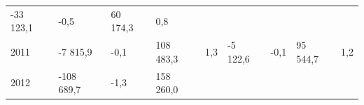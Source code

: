 \begin{longtable}[]{@{}lllllllll@{}}
\begin{minipage}[t]{0.12\columnwidth}
-33 123,1\strut
\end{minipage} & \begin{minipage}[t]{0.06\columnwidth}\raggedright
-0,5\strut
\end{minipage} & \begin{minipage}[t]{0.08\columnwidth}\raggedright
60 174,3\strut
\end{minipage} & \begin{minipage}[t]{0.06\columnwidth}\raggedright
0,8\strut
\end{minipage}\tabularnewline
\begin{minipage}[t]{0.05\columnwidth}\raggedright
2011\strut
\end{minipage} & \begin{minipage}[t]{0.10\columnwidth}\raggedright
-7 815,9\strut
\end{minipage} & \begin{minipage}[t]{0.06\columnwidth}\raggedright
-0,1\strut
\end{minipage} & \begin{minipage}[t]{0.17\columnwidth}\raggedright
108 483,3\strut
\end{minipage} & \begin{minipage}[t]{0.06\columnwidth}\raggedright
1,3\strut
\end{minipage} & \begin{minipage}[t]{0.12\columnwidth}\raggedright
-5 122,6\strut
\end{minipage} & \begin{minipage}[t]{0.06\columnwidth}\raggedright
-0,1\strut
\end{minipage} & \begin{minipage}[t]{0.08\columnwidth}\raggedright
95 544,7\strut
\end{minipage} & \begin{minipage}[t]{0.06\columnwidth}\raggedright
1,2\strut
\end{minipage}\tabularnewline
\begin{minipage}[t]{0.05\columnwidth}\raggedright
2012\strut
\end{minipage} & \begin{minipage}[t]{0.10\columnwidth}\raggedright
-108 689,7\strut
\end{minipage} & \begin{minipage}[t]{0.06\columnwidth}\raggedright
-1,3\strut
\end{minipage} & \begin{minipage}[t]{0.17\columnwidth}\raggedright
158 260,0\strut
\end{minipage} & \begin{minipage}[t]{0.06\columnwidth}\raggedright

\end{minipage}
\end{longtable}
